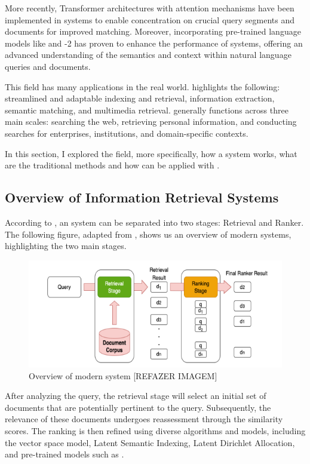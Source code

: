 More recently, Transformer architectures with attention mechanisms have been implemented in {\ir} systems to enable concentration on crucial query segments and documents for improved matching. Moreover, incorporating pre-trained language models like {\bert} and {\gpt}-2 has proven to enhance the performance of {\ir} systems, offering an advanced understanding of the semantics and context within natural language queries and documents.

This field has many applications in the real world. \citet{p_m_efficient_2021} highlights the following: streamlined and adaptable indexing and retrieval, information extraction, semantic matching, and multimedia retrieval. {\ir} generally functions across three main scales: searching the web, retrieving personal information, and conducting searches for enterprises, institutions, and domain-specific contexts.

In this section, I explored the {\ir} field, more specifically, how a {\ir} system works, what are the traditional methods and how {\ir} can be applied with {\nlp}.


\subsection{Overview of Information Retrieval Systems}

According to \citet{hambarde_information_2023}, an {\ir} system can be separated into two stages: Retrieval and Ranker. The following figure, adapted from \citet{hambarde_information_2023}, shows us an overview of modern {\ir} systems, highlighting the two main stages.

\begin{figure}[ht]
    \includegraphics[width=14cm]{figs/chapter2/IR_system.png}
    \centering
    \caption{Overview of modern {\ir} system [REFAZER IMAGEM]}
\end{figure}

After analyzing the query, the retrieval stage will select an initial set of documents that are potentially pertinent to the query. Subsequently, the relevance of these documents undergoes reassessment through the similarity scores. The ranking is then refined using diverse algorithms and models, including the vector space model, Latent Semantic Indexing, Latent Dirichlet Allocation, and pre-trained models such as {\bert}.

